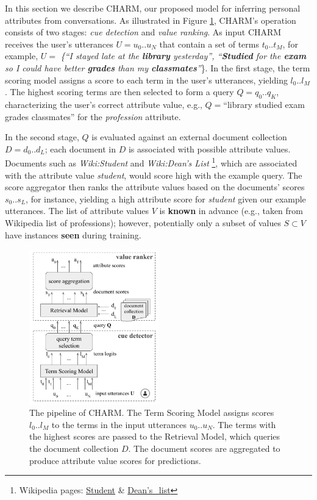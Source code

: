 
In this section we describe CHARM, our proposed model for inferring personal attributes from conversations. As illustrated in Figure \ref{pipeline}, CHARM's operation consists of two stages: \emph{cue detection} and \emph{value ranking}. 
As input CHARM receives the user's utterances $U=u_0..u_N$ that contain a set of terms $t_0..t_M$, for example, $U=${\em 
\{``I stayed late at the \textbf{library} yesterday'', ``\textbf{Studied} for the \textbf{exam} so I could have better \textbf{grades} than my \textbf{classmates}''}\}. 
In the first stage, the term scoring model assigns a score to each term in the user's utterances, yielding $l_0..l_M$. The highest scoring terms are then selected to form a query $Q=q_0..q_K$, characterizing the user's correct attribute value, e.g., $Q=$``library studied exam grades classmates'' for the \emph{profession} attribute. 

In the second stage, $Q$ is evaluated against an external document collection $D=d_0..d_L$; each document in $D$ is associated with possible attribute values.  
Documents such as \emph{Wiki:Student} and \emph{Wiki:Dean's List}
\footnote{Wikipedia pages: \href{https://en.wikipedia.org/wiki/Student}{{Student}} \& \href{https://en.wikipedia.org/wiki/Dean\%27s_list}{{Dean's\_list}}}, which are associated with the attribute value \emph{student}, would score high with the example query.
The score aggregator then ranks the attribute values based on the documents' scores $s_0..s_L$, for instance, yielding a high attribute score for \emph{student} given our example utterances. The list of attribute values $V$ is \textbf{known} in advance (e.g., taken from Wikipedia list of professions); however, potentially only a subset of values $S \subset V$ have instances \textbf{seen} during training.


\begin{figure}[t!]
\centering
\includegraphics[width=0.5\textwidth]{imgs/scheme.png}
\vspace*{-0.3cm}
\caption{The pipeline of CHARM.
The Term Scoring Model assigns scores $l_0 .. l_M$ to the terms in the input utterances $u_0..u_N$. The terms with the highest scores are passed to the Retrieval Model, which queries the document collection $D$. The document scores are aggregated to produce attribute value scores
for predictions.
}
\label{pipeline}
\end{figure}

